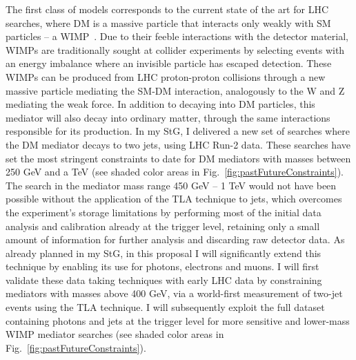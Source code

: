 \documentclass[11pt,a4paper]{article}
\begin{document}
The first class of models corresponds to the current state of the art for LHC searches, where DM is a massive particle that interacts only weakly with SM particles -- a WIMP~\cite{DMWG_Benchmarks,AR}. 
Due to their feeble interactions with the detector material, WIMPs are traditionally sought at collider experiments by selecting events with an energy imbalance where an invisible particle has escaped detection. 
These WIMPs can be produced from LHC proton-proton collisions through a new massive particle mediating the SM-DM interaction, analogously to the W and Z mediating the weak force. In addition to decaying into DM particles, this mediator will also decay into ordinary matter, through the same interactions responsible for its production. 
In my StG, I delivered a new set of searches where the DM mediator decays to two jets, using LHC Run-2 data. 
These searches have set the most stringent constraints to date for DM mediators with masses between 250 GeV and a TeV (see shaded \color{red} color \color{black} areas in Fig.~\ref{fig:pastFutureConstraints}). 
The search in the mediator mass range 450 GeV -- 1 TeV would not have been possible without the application of the TLA technique to jets, which overcomes the experiment's storage limitations by performing most of the initial data analysis and calibration already at the trigger level, retaining only a small amount of information for further analysis and discarding raw detector data. 
As already planned in my StG, in this proposal I will significantly extend this technique by enabling its use for photons, electrons and muons. 
I will first validate these data taking techniques with early LHC data by constraining mediators with masses above 400 GeV, via a world-first measurement of two-jet events using the TLA technique. I will subsequently exploit the full dataset containing photons and jets at the trigger level for more sensitive and lower-mass WIMP mediator searches (see shaded \color{red} color \color{black} areas in Fig.~\ref{fig:pastFutureConstraints}). 
\end{document}

